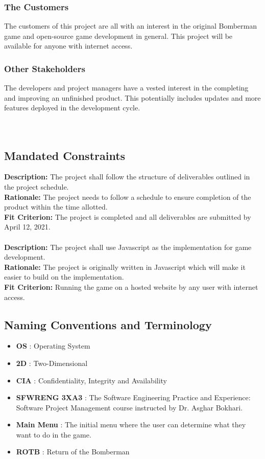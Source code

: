 \documentclass[12pt, titlepage]{article}
\begin{document}
\subsubsection{The Customers}
The customers of this project are all with an interest in the original Bomberman game and open-source game development in general. This project will be available for anyone with internet access.

\subsubsection{Other Stakeholders}
The developers and project managers have a vested interest in the completing and improving an unfinished product. This potentially includes updates and more features deployed in the development cycle.
\\ \\ \\ 

\subsection{Mandated Constraints}
\textbf{Description:} The project shall follow the structure of deliverables outlined in the project schedule. \\
\textbf{Rationale:} The project needs to follow a schedule to ensure completion of the product within the time allotted. \\
\textbf{Fit Criterion:} The project is completed and all deliverables are submitted by April 12, 2021. \\ \\
\textbf{Description:} The project shall use Javascript as the implementation for game development. \\
\textbf{Rationale:} The project is originally written in Javascript which will make it easier to build on the implementation. \\
\textbf{Fit Criterion:} Running the game on a hosted website by any user with internet access.


\subsection{Naming Conventions and Terminology}

\begin{itemize}
    \item \textbf{OS} : Operating System
    \item \textbf{2D} : Two-Dimensional
    \item \textbf{CIA} : Confidentiality, Integrity and Availability
    \item \textbf{SFWRENG 3XA3} : The Software Engineering Practice and Experience: Software Project Management course instructed by Dr. Asghar Bokhari.
    \item \textbf{Main Menu} : The initial menu where the user can determine what they want to do in the game.
    \item \textbf{ROTB} : Return of the Bomberman
\end{itemize}
\end{document}

